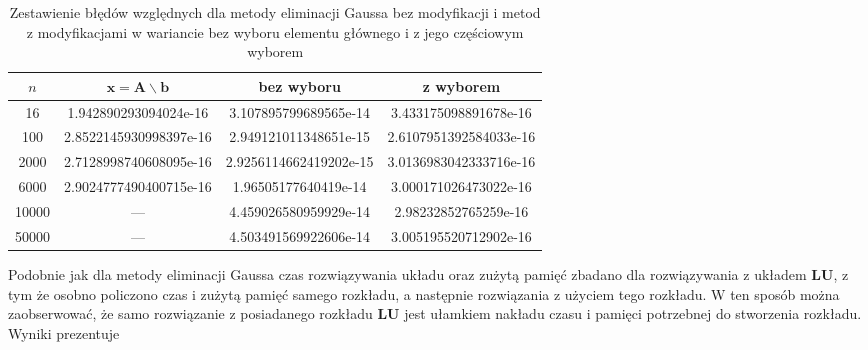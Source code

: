 \documentclass{mk-polish-lab-report}
\newcommand{\mA}{\bm{A}}
\newcommand{\mL}{\bm{L}}
\newcommand{\mU}{\bm{U}}
\newcommand{\vb}{\bm{b}}
\newcommand{\vx}{\bm{x}}
\begin{document}
\begin{table}[!h]
        \centering
        \footnotesize
\begin{tabular}{c|
		S[
        table-number-alignment = right,
		table-figures-integer  = 1,
		table-figures-decimal = 16,
		table-figures-exponent = 3
		]
		|S[
        table-number-alignment = right,
		table-figures-integer  = 1,
		table-figures-decimal = 16,
		table-figures-exponent = 3
		]
		|S[
        table-number-alignment = right,
		table-figures-integer  = 1,
		table-figures-decimal = 16,
		table-figures-exponent = 3
		]
		}
$n$ & {$\vx = \mA \backslash \vb$} & {bez wyboru} & {z wyborem} \\  & 1.942890293094024e-16 & 3.107895799689565e-14 & 3.433175098891678e-16 \\
100 & 2.8522145930998397e-16 & 2.949121011348651e-15 & 2.6107951392584033e-16 \\
2000 & 2.7128998740608095e-16 & 2.9256114662419202e-15 & 3.0136983042333716e-16 \\
6000 & 2.9024777490400715e-16 & 1.96505177640419e-14 & 3.000171026473022e-16 \\
10000 & {---} & 4.459026580959929e-14 & 2.98232852765259e-16 \\
50000 & {---} & 4.503491569922606e-14 & 3.005195520712902e-16 \\
\end{tabular}
\caption{Zestawienie błędów względnych dla metody eliminacji Gaussa bez modyfikacji i metod z modyfikacjami w wariancie bez wyboru elementu głównego i z jego częściowym wyborem}
\label{table:2}
\end{table}	

\noindent Podobnie jak dla metody eliminacji Gaussa czas rozwiązywania układu oraz zużytą pamięć zbadano dla rozwiązywania z układem $\mL\mU$, z tym że osobno policzono czas i zużytą pamięć samego rozkładu, a następnie rozwiązania z użyciem tego rozkładu. W ten sposób można zaobserwować, że samo rozwiązanie z posiadanego rozkładu $\mL\mU$ jest ułamkiem nakładu czasu i pamięci potrzebnej do stworzenia rozkładu. Wyniki prezentuje 
\end{document}
